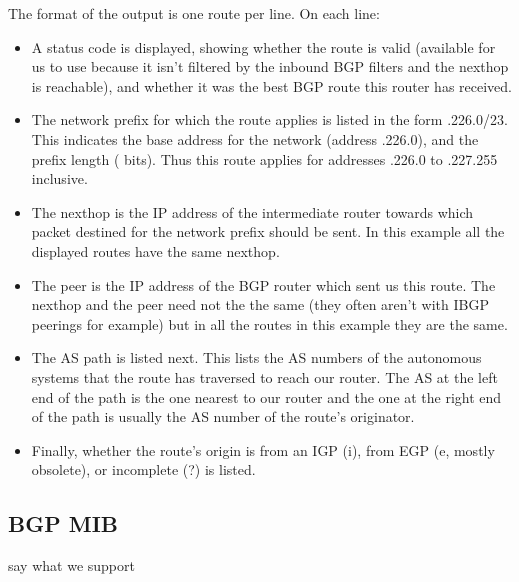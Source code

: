 The format of the output is one route per line.  On each line:
\begin{itemize}
\item A status code is displayed, showing whether the route is valid
(available for us to use because it isn't filtered by the inbound BGP
filters and the nexthop is reachable), and whether it was the best BGP
route this router has received.
\item The network prefix for which the route applies is listed in the
  form {.226.0/23}.  This indicates the base address for the
  network (address {.226.0}), and the prefix length ({} bits).
  Thus this route applies for addresses {.226.0} to {.227.255} inclusive.
\item The nexthop is the IP address of the intermediate router towards
  which packet destined for the network prefix should be sent.  In
  this example all the displayed routes have the same nexthop.
\item The peer is the IP address of the BGP router which sent us this
  route.  The nexthop and the peer need not the the same (they often
  aren't with IBGP peerings for example) but in all the routes in this
  example they are the same.
\item The AS path is listed next.  This lists the AS numbers of the
  autonomous systems that the route has traversed to reach our
  router.  The AS at the left end of the path is the one nearest to
  our router and the one at the right end of the path is usually the
  AS number of the route's originator.  
\item Finally, whether the route's origin is from an IGP ({\stt i}),
  from EGP ({\stt e}, mostly obsolete), or incomplete ({\stt ?}) is
  listed.
\end{itemize}

\subsection{BGP MIB}

say what we support